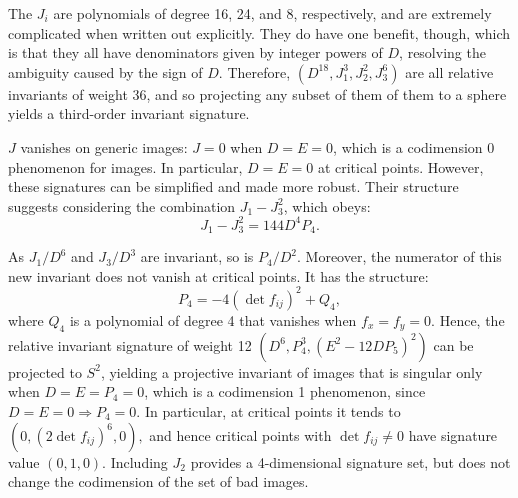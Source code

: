 \documentclass{artjlt}
\begin{document}
The $J_i$ are polynomials of degree 16, 24, and 8, respectively, and are extremely complicated when written out explicitly. They do have one benefit, though, which is that they  all have denominators given by integer powers of $D$, resolving the ambiguity caused by the sign of $D$. Therefore, $ (D^{18}, J_1^3, J_2^2, J_3^6)$ are all relative invariants of weight 36, and so projecting any subset of them of them to a sphere yields a third-order invariant signature.

$J$ vanishes on generic images: $J=0$ when $D=E=0$, which is a codimension 0 phenomenon for images. In particular, $D=E=0$ at critical points. However, these signatures can be simplified and made more robust. Their structure suggests considering the combination $J_1 - J_3^2$, which obeys:
$$J_1 - J_3^2 = 144 D^4 P_4.$$

As $J_1/D^6$ and $J_3/D^3$ are invariant, so is $P_4/D^2$. 
Moreover, the numerator of this new invariant does not vanish at critical points.  It has the structure:
$$P_4 = -4(\det f_{ij})^2 + Q_4,$$
where $Q_4$ is a polynomial of degree 4 that vanishes when $f_x=f_y=0$. Hence, the relative invariant signature of weight 12 $ (D^6, P_4^3, (E^2-12D P_5)^2)$ can be projected to $S^2$, yielding a projective invariant of images that is singular only when $D=E=P_4=0$, which is a codimension 1 phenomenon, since  $D=E=0\Rightarrow P_4=0$. In particular, at critical points it tends to $(0, (2\det f_{ij})^6, 0),$ and hence critical points with $\det f_{ij}\ne 0$ have signature value $(0,1,0)$.
Including $J_2$ provides a 4-dimensional signature set, but does not change the codimension of the set of bad images.


 
 
\end{document}
